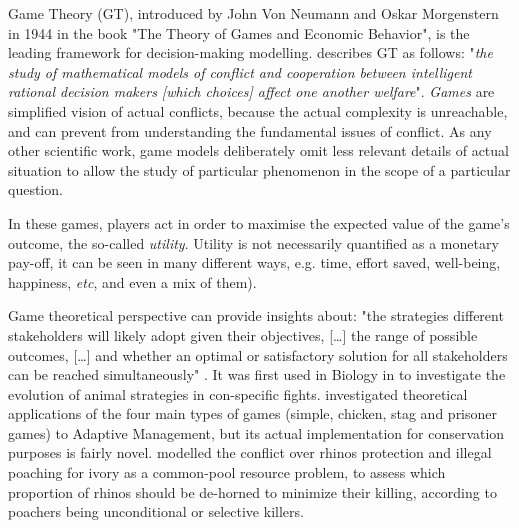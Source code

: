 \documentclass[12pt,a4paper]{article}
\begin{document}
Game Theory (GT), introduced by John Von Neumann and Oskar Morgenstern in 1944 in the book "The Theory of Games and Economic Behavior", is the leading framework for decision-making modelling.
\cite{myerson1997game} describes GT as follows: "\textit{the study of mathematical models of conflict and cooperation between intelligent rational decision makers [which choices] affect one another welfare}".
\textit{Games} are simplified vision of actual conflicts, because the actual complexity is unreachable, and can prevent from understanding the fundamental issues of conflict. %
As any other scientific work, game models deliberately omit less relevant details of actual situation to allow the study of particular phenomenon in the scope of a particular question.

In these games, players act in order to maximise the expected value of the game's outcome, the so-called \textit{utility}.
Utility is not necessarily quantified as a monetary pay-off, it can be seen in many different ways, e.g. time, effort saved, well-being, happiness, \textit{etc}, and even a mix of them).

Game theoretical perspective can provide insights about: "the strategies different stakeholders will likely adopt given their objectives, [\dots] the range of possible outcomes, [\dots] and whether an optimal or satisfactory solution for all stakeholders can be reached simultaneously" \citep{COLYVAN20111246}.
It was first used in Biology in \cite{maynard1973logic} to investigate the evolution of animal strategies in con-specific fights.
\cite{COLYVAN20111246} investigated theoretical applications of the four main types of games (simple, chicken, stag and prisoner games) to Adaptive Management, but its actual implementation for conservation purposes is fairly novel. 
\cite{glynatsi2018evolutionary} modelled the conflict over rhinos protection and illegal poaching for ivory as a common-pool resource problem, to assess which proportion of rhinos should be de-horned to minimize their killing, according to poachers being unconditional or selective killers. %
\end{document}
